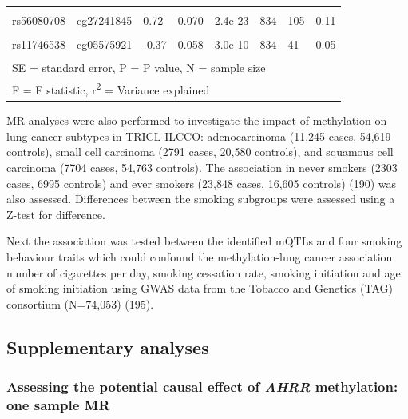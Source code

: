 \documentclass[11pt,oneside]{bristolthesis}
\begin{document}
\begin{table}[!h]
{\begin{tabular}[t]{llllllll}
\cellcolor{gray!6}{rs463924} & \cellcolor{gray!6}{cg26963277} & \cellcolor{gray!6}{-0.39} & \cellcolor{gray!6}{0.045} & \cellcolor{gray!6}{6.8e-18} & \cellcolor{gray!6}{834} & \cellcolor{gray!6}{78} & \cellcolor{gray!6}{0.09}\\
rs56080708 & cg27241845 & 0.72 & 0.070 & 2.4e-23 & 834 & 105 & 0.11\\
\cellcolor{gray!6}{rs11744553} & \cellcolor{gray!6}{cg05575921} & \cellcolor{gray!6}{0.22} & \cellcolor{gray!6}{0.040} & \cellcolor{gray!6}{7.2e-08} & \cellcolor{gray!6}{834} & \cellcolor{gray!6}{30} & \cellcolor{gray!6}{0.03}\\
\addlinespace
rs11746538 & cg05575921 & -0.37 & 0.058 & 3.0e-10 & 834 & 41 & 0.05\\
\bottomrule
\multicolumn{8}{l}{\textsuperscript{} SE = standard error, P = P value, N = sample size}\\
\multicolumn{8}{l}{\textsuperscript{} F = F statistic, r\textsuperscript{2} = Variance explained}\\
\end{tabular}}
\end{table}
\linebreak

MR analyses were also performed to investigate the impact of methylation on lung cancer subtypes in TRICL-ILCCO: adenocarcinoma (11,245 cases, 54,619 controls), small cell carcinoma (2791 cases, 20,580 controls), and squamous cell carcinoma (7704 cases, 54,763 controls). The association in never smokers (2303 cases, 6995 controls) and ever smokers (23,848 cases, 16,605 controls) (190) was also assessed. Differences between the smoking subgroups were assessed using a Z-test for difference.

Next the association was tested between the identified mQTLs and four smoking behaviour traits which could confound the methylation-lung cancer association: number of cigarettes per day, smoking cessation rate, smoking initiation and age of smoking initiation using GWAS data from the Tobacco and Genetics (TAG) consortium (N=74,053) (195).

\hypertarget{methods-supplementary-analyses-07}{%
\subsection{Supplementary analyses}\label{methods-supplementary-analyses-07}}

\hypertarget{ahrr-one-sample-mr-methods}{%
\subsubsection{\texorpdfstring{Assessing the potential causal effect of \emph{AHRR} methylation: one sample MR}{Assessing the potential causal effect of AHRR methylation: one sample MR}}\label{ahrr-one-sample-mr-methods}}
\end{document}
